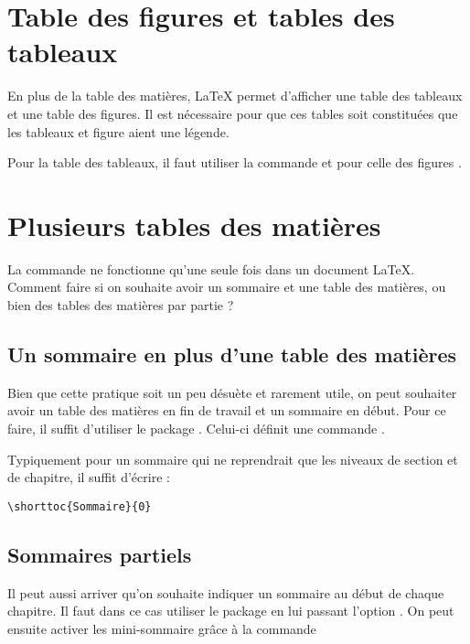 \section{Table des figures et tables des tableaux}\label{tablefigure}

En plus de la table des matières, \LaTeX{} permet d'afficher une table des tableaux et une table des figures. Il est nécessaire pour que ces tables soit constituées que les tableaux et figure aient une légende.

Pour la table des tableaux, il faut utiliser la commande  et pour celle des figures  .



\section{Plusieurs tables des matières}

La commande  ne fonctionne qu'une seule fois dans un document \LaTeX{}. Comment faire si on souhaite avoir un sommaire et une table des matières, ou bien des tables des matières par partie ?

\subsection{Un sommaire en plus d'une table des matières}

Bien que cette pratique soit un peu désuète et rarement utile, on peut souhaiter  avoir un table des matières en fin de travail et un sommaire en début.
Pour ce faire, il suffit d'utiliser le package . Celui-ci définit une commande 
.

Typiquement pour un sommaire qui ne reprendrait que les niveaux de section et de chapitre, il suffit d'écrire :

\begin{verbatim}
\shorttoc{Sommaire}{0}
\end{verbatim}




\subsection{Sommaires partiels}

Il peut aussi arriver qu'on souhaite indiquer un sommaire au début de chaque chapitre. Il faut dans ce cas utiliser le package  en lui passant l'option . On peut ensuite activer les mini-sommaire grâce à la commande 

